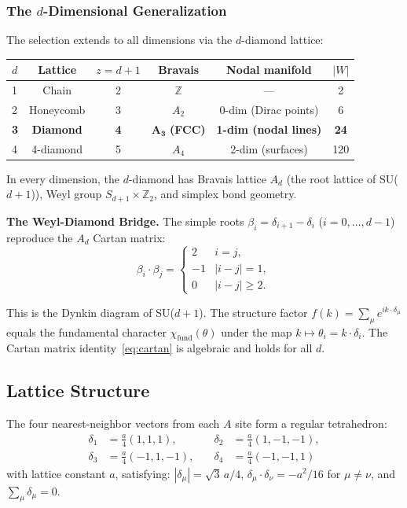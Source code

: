 \documentclass[aps,prd,onecolumn,superscriptaddress,floatfix,12pt]{revtex4-2}
\begin{document}
\subsubsection{The $d$-Dimensional Generalization}

The selection extends to all dimensions via the $d$-diamond lattice:

\begin{table}[t]
\begin{tabular}{lccccc}
\toprule
$d$ & Lattice & $z{=}d{+}1$ & Bravais & Nodal manifold & $|W|$ \\
\midrule
1 & Chain & 2 & $\mathbb{Z}$ & --- & 2 \\
2 & Honeycomb & 3 & $A_2$ & 0-dim (Dirac points) & 6 \\
\textbf{3} & \textbf{Diamond} & \textbf{4} & $\bm{A_3}$ \textbf{(FCC)} & \textbf{1-dim (nodal lines)} & \textbf{24} \\
4 & 4-diamond & 5 & $A_4$ & 2-dim (surfaces) & 120 \\
\bottomrule
\end{tabular}
\end{table}

In every dimension, the $d$-diamond has Bravais lattice $A_d$ (the root lattice of SU($d{+}1$)), Weyl group $S_{d+1} \times \mathbb{Z}_2$, and simplex bond geometry.

\textbf{The Weyl-Diamond Bridge.} The simple roots $\beta_i = \delta_{i+1} - \delta_i$ ($i = 0, \ldots, d{-}1$) reproduce the $A_d$ Cartan matrix:
\begin{equation}\label{eq:cartan}
\beta_i \cdot \beta_j = \begin{cases} 2 & i = j, \\ -1 & |i - j| = 1, \\ 0 & |i - j| \geq 2. \end{cases}
\end{equation}

This is the Dynkin diagram of SU($d{+}1$). The structure factor $f(k) = \sum_\mu e^{ik \cdot \delta_\mu}$ equals the fundamental character $\chi_{\text{fund}}(\theta)$ under the map $k \mapsto \theta_i = k \cdot \delta_i$. The Cartan matrix identity~\eqref{eq:cartan} is algebraic and holds for all $d$.

\subsection{Lattice Structure}\label{sec:3-2}

The four nearest-neighbor vectors from each $A$ site form a regular tetrahedron:
\begin{align}\label{eq:deltas}
\delta_1 &= \tfrac{a}{4}(1,1,1), &\quad \delta_2 &= \tfrac{a}{4}(1,-1,-1), \nonumber \\
\delta_3 &= \tfrac{a}{4}(-1,1,-1), &\quad \delta_4 &= \tfrac{a}{4}(-1,-1,1)
\end{align}
with lattice constant $a$, satisfying: $|\delta_\mu| = \sqrt{3}\,a/4$, $\delta_\mu \cdot \delta_\nu = -a^2/16$ for $\mu \neq \nu$, and $\sum_\mu \delta_\mu = 0$.
\end{document}

